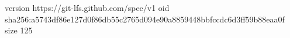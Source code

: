 version https://git-lfs.github.com/spec/v1
oid sha256:a5743df86e127d0f86db55c2765d094e90a8859448bbfccdc6d3ff59b88eaa0f
size 125
